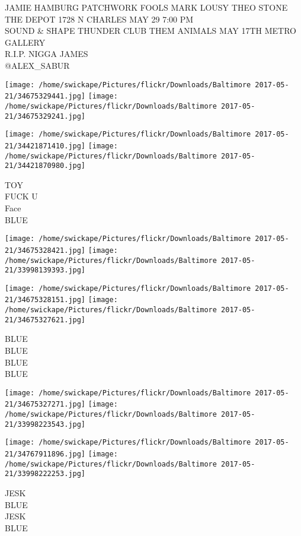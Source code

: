 \documentclass[10pt,letterpaper]{article}
\begin{document}
JAMIE HAMBURG PATCHWORK FOOLS MARK LOUSY THEO STONE THE DEPOT 1728 N CHARLES MAY 29 7:00 PM\\
SOUND \& SHAPE THUNDER CLUB THEM ANIMALS MAY 17TH METRO GALLERY\\
R.I.P. NIGGA JAMES\\
@ALEX\_SABUR\\
\pagebreak

\texttt{[image: /home/swickape/Pictures/flickr/Downloads/Baltimore 2017-05-21/34675329441.jpg]}
\texttt{[image: /home/swickape/Pictures/flickr/Downloads/Baltimore 2017-05-21/34675329241.jpg]}

\texttt{[image: /home/swickape/Pictures/flickr/Downloads/Baltimore 2017-05-21/34421871410.jpg]}
\texttt{[image: /home/swickape/Pictures/flickr/Downloads/Baltimore 2017-05-21/34421870980.jpg]}

TOY\\
FUCK U\\
Face\\
BLUE\\
\pagebreak

\texttt{[image: /home/swickape/Pictures/flickr/Downloads/Baltimore 2017-05-21/34675328421.jpg]}
\texttt{[image: /home/swickape/Pictures/flickr/Downloads/Baltimore 2017-05-21/33998139393.jpg]}

\texttt{[image: /home/swickape/Pictures/flickr/Downloads/Baltimore 2017-05-21/34675328151.jpg]}
\texttt{[image: /home/swickape/Pictures/flickr/Downloads/Baltimore 2017-05-21/34675327621.jpg]}

BLUE\\
BLUE\\
BLUE\\
BLUE\\
\pagebreak

\texttt{[image: /home/swickape/Pictures/flickr/Downloads/Baltimore 2017-05-21/34675327271.jpg]}
\texttt{[image: /home/swickape/Pictures/flickr/Downloads/Baltimore 2017-05-21/33998223543.jpg]}

\texttt{[image: /home/swickape/Pictures/flickr/Downloads/Baltimore 2017-05-21/34767911896.jpg]}
\texttt{[image: /home/swickape/Pictures/flickr/Downloads/Baltimore 2017-05-21/33998222253.jpg]}

JESK\\
BLUE\\
JESK\\
BLUE\\
\pagebreak
\end{document}
